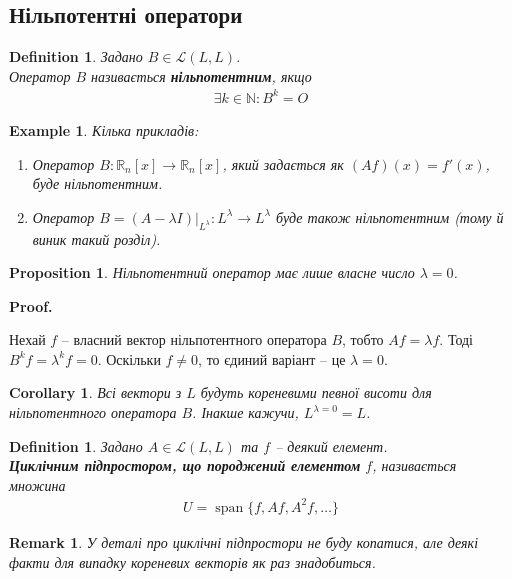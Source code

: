 \documentclass[a4paper, 10pt]{article}
\makeatletter
\theoremstyle{theoremdd}
\newtheorem{definition}[theorem]{Definition}
\newtheorem{example}[theorem]{Example}
\newtheorem{proposition}[theorem]{Proposition}
\newtheorem{remark}[theorem]{Remark}
\newtheorem{corollary}[theorem]{Corollary}
\DeclareMathOperator{\linspan}{span}
\renewenvironment{proof}[1][Proof.\\]{\par
\pushQED{\hfill \qed}%
\normalfont \topsep6\p@\@plus6\p@\relax
\trivlist
\item\relax
{\bfseries
#1\@addpunct{.}}\hspace\labelsep\ignorespaces
}{%
\popQED\endtrivlist\@endpefalse
}
\makeatother
\begin{document}
\subsection{Нільпотентні оператори}
\begin{definition}
Задано $B \in \mathcal{L}(L,L)$.\\
Оператор $B$ називається \textbf{нільпотентним}, якщо
\begin{align*}
\exists k \in \mathbb{N}: B^k = O
\end{align*}
\end{definition}

\begin{example}
Кілька прикладів:
\begin{enumerate}[nosep,wide=0pt,label={\arabic*)}]
\item Оператор $B \colon \mathbb{R}_n[x] \to \mathbb{R}_n[x]$, який задається як $(Af)(x) = f'(x)$, буде нільпотентним.
\item Оператор $B = (A-\lambda I)|_{L^\lambda} \colon L^{\lambda} \to L^{\lambda}$ буде також нільпотентним (тому й виник такий розділ).
\end{enumerate}
\end{example}

\begin{proposition}
Нільпотентний оператор має лише власне число $\lambda = 0$.
\end{proposition}

\begin{proof}
Нехай $f$ -- власний вектор нільпотентного оператора $B$, тобто $Af = \lambda f$. Тоді $B^k f = \lambda^k f = 0$. Оскільки $f \neq 0$, то єдиний варіант -- це $\lambda = 0$.
\end{proof}

\begin{corollary}
Всі вектори з $L$ будуть кореневими певної висоти для нільпотентного оператора $B$. Інакше кажучи, $L^{\lambda =  0} = L$.
\end{corollary}

\begin{definition}
Задано $A \in \mathcal{L}(L,L)$ та $f$ -- деякий елемент.\\
\textbf{Циклічним підпростором, що породжений елементом} $f$, називається множина
\begin{align*}
U = \linspan\{f,Af,A^2f,\dots\}
\end{align*}
\end{definition}

\begin{remark}
У деталі про циклічні підпростори не буду копатися, але деякі факти для випадку кореневих векторів як раз знадобиться.
\end{remark}
\end{document}

